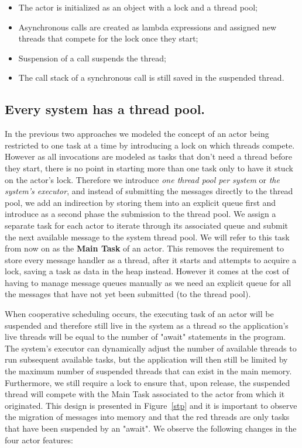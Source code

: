 \begin{itemize}
	\item The actor is initialized as an object with a lock and a thread pool;
	\item Asynchronous calls are created as lambda expressions and assigned new threads that compete for the lock once they start;
	\item Suspension of a call suspends the thread;
	\item The call stack of a synchronous call is still saved in the suspended thread.
\end{itemize}





\subsection{Every system has a thread pool.}
In the previous two approaches we modeled the concept of an actor being restricted to one task at a time by introducing a lock on which threads compete. However as all invocations are modeled as tasks that don't need a thread before they start, there is no point in starting more than one task only to have it stuck on the actor's lock. Therefore we introduce \textit{one thread pool per system} or \textit{the system's executor}, and instead of submitting the messages directly to the thread pool, we add an indirection by storing them into an explicit queue first and introduce as a second phase the submission to the thread pool. We assign a separate task for each actor to iterate through its associated queue and submit the next available message to the system thread pool. We will refer to this task from now on as the \textbf{Main Task} of an actor. This removes the requirement to store every message handler as a thread, after it starts and attempts to acquire a lock, saving a task as data in the heap instead.  However it comes at the cost of having to manage message queues manually as we need an explicit queue for all the messages that have not yet been submitted (to the thread pool). 
\par When cooperative scheduling occurs, the executing task of an actor will be suspended and therefore still live in the system as a thread so the application's live threads will be equal to the number of "await" statements in the program. The system's executor can dynamically adjust the number of available threads to run subsequent available tasks, but the application will then still be limited by the maximum number of suspended threads that can exist in the main memory. Furthermore, we still require a lock to ensure that, upon release, the suspended thread will compete with the Main Task associated to the actor from which it originated. This design is presented in Figure~\ref{stp} and it is important to observe the migration of messages into memory and that the red threads are only tasks that have been suspended by an "await". We observe the following changes in the four actor features:

